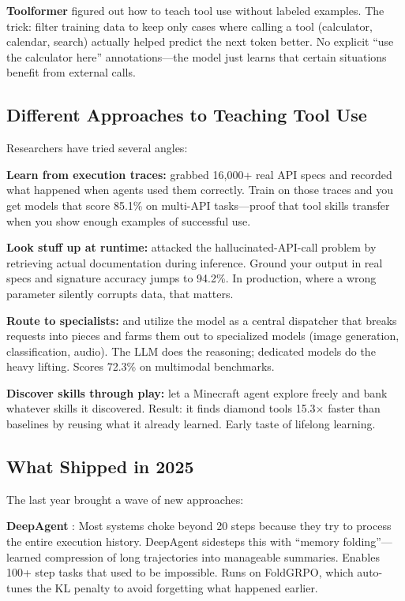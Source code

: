 \documentclass[12pt,a4paper]{report}
\theoremstyle{definition}
\begin{document}
\textbf{Toolformer} \cite{schick2023toolformer} figured out how to teach tool use without labeled examples. The trick: filter training data to keep only cases where calling a tool (calculator, calendar, search) actually helped predict the next token better. No explicit ``use the calculator here'' annotations---the model just learns that certain situations benefit from external calls.

\subsection{Different Approaches to Teaching Tool Use}
\label{sec:tool_learning}

Researchers have tried several angles:

\textbf{Learn from execution traces:} \citet{qin2023toolllm} grabbed 16,000+ real API specs and recorded what happened when agents used them correctly. Train on those traces and you get models that score 85.1\% on multi-API tasks---proof that tool skills transfer when you show enough examples of successful use.

\textbf{Look stuff up at runtime:} \citet{patil2023gorilla} attacked the hallucinated-API-call problem by retrieving actual documentation during inference. Ground your output in real specs and signature accuracy jumps to 94.2\%. In production, where a wrong parameter silently corrupts data, that matters.

\textbf{Route to specialists:} \citet{shen2023hugginggpt} and \citet{liang2023taskmatrix} utilize the model as a central dispatcher
 that breaks requests into pieces and farms them out to specialized models (image generation, classification, audio).
 The LLM does the reasoning; dedicated models do the heavy lifting. Scores 72.3\% on multimodal benchmarks.

\textbf{Discover skills through play:} \citet{wang2023voyager} let a Minecraft agent explore freely and bank whatever skills it discovered. Result: it finds diamond tools 15.3$\times$ faster than baselines by reusing what it already learned. Early taste of lifelong learning.

\subsection{What Shipped in 2025}
\label{sec:tool_learning_2025}

The last year brought a wave of new approaches:

\textbf{DeepAgent} \cite{li2025deepagent}: Most systems choke beyond 20 steps because they try to process the entire execution history. DeepAgent sidesteps this with ``memory folding''---learned compression of long trajectories into manageable summaries. Enables 100+ step tasks that used to be impossible. Runs on FoldGRPO, which auto-tunes the KL penalty to avoid forgetting what happened earlier.
\end{document}
